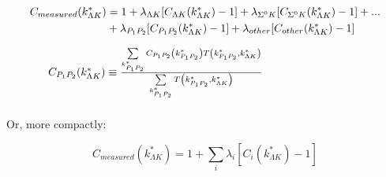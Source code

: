 \documentclass[/home/jesse/Analysis/FemtoAnalysis/AnalysisNotes/AnalysisNoteJBuxton.tex]{subfiles}
\begin{document}
\begin{equation}
\begin{array}{l}
\vspace{4mm}
\begin{split}
 C_{measured}(k^{*}_{\Lambda K}) & = 1 + \lambda_{\Lambda K}[C_{\Lambda K}(k^{*}_{\Lambda K})-1] + \lambda_{\Sigma^{0}K}[C_{\Sigma^{0}K}(k^{*}_{\Lambda K})-1] + ... \\ &
 + \lambda_{P_{1}P_{2}}[C_{P_{1}P_{2}}(k^{*}_{\Lambda K})-1] + \lambda_{other}[C_{other}(k^{*}_{\Lambda K})-1] 
\end{split}
\\
\vspace{2mm}
  ~~~~~C_{P_{1}P_{2}}(k^{*}_{\Lambda K}) \equiv \frac{\sum\limits_{k^{*}_{P_{1}P_{2}}} C_{P_{1}P_{2}}\left(k^{*}_{P_{1}P_{2}}\right) T\left(k^{*}_{P_{1}P_{2}},k^{*}_{\Lambda K}\right)}{\sum\limits_{k^{*}_{P_{1}P_{2}}} T\left(k^{*}_{P_{1}P_{2}},k^{*}_{\Lambda K}\right)}
\end{array} 
\label{eqn:ResidualsFull}
\end{equation}

  Or, more compactly:

\begin{equation}
 C_{measured}(k^{*}_{\Lambda K}) = 1 + \sum\limits_{i}  \lambda_{i}[C_{i}(k^{*}_{\Lambda K})-1]
\label{eqn:Residuals}
\end{equation}
\end{document}
